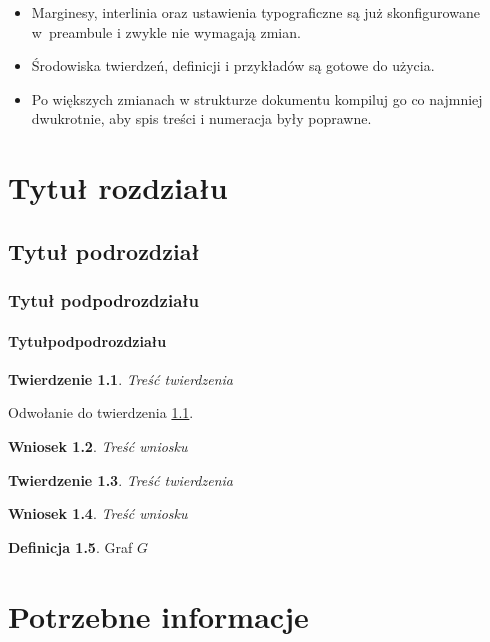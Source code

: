 \documentclass[12pt,a4paper,twoside]{report}
\newtheorem{twierdzenie}{Twierdzenie}[chapter]
\newtheorem{wniosek}[twierdzenie]{Wniosek}
\theoremstyle{definition} %
\newtheorem{definicja}[twierdzenie]{Definicja}
\begin{document}
\begin{itemize}
    \item Marginesy, interlinia oraz ustawienia typograficzne są już skonfigurowane w~preambule i zwykle nie wymagają zmian.
    \item Środowiska twierdzeń, definicji i przykładów są gotowe do użycia.
    \item Po większych zmianach w strukturze dokumentu kompiluj go co najmniej dwukrotnie, aby spis treści i numeracja były poprawne.
\end{itemize}
    
	\chapter{Tytuł rozdziału}
	\section{Tytuł podrozdział}
	\subsection{Tytuł podpodrozdziału}
    \subsubsection{Tytułpodpodrozdziału}
	
	\begin{twierdzenie}\label{tw1}
		Treść twierdzenia
	\end{twierdzenie}
	
	Odwołanie do twierdzenia \ref{tw1}.
	
	\begin{wniosek}
		Treść wniosku
	\end{wniosek}
	
	
	\begin{twierdzenie}
		Treść twierdzenia
	\end{twierdzenie}
	
	\begin{wniosek}
		Treść wniosku
	\end{wniosek}
	
	\begin{definicja}
		Graf $G$
	\end{definicja}

    \cleardoublepage
	
	\chapter{Potrzebne informacje}
	
\end{document}
